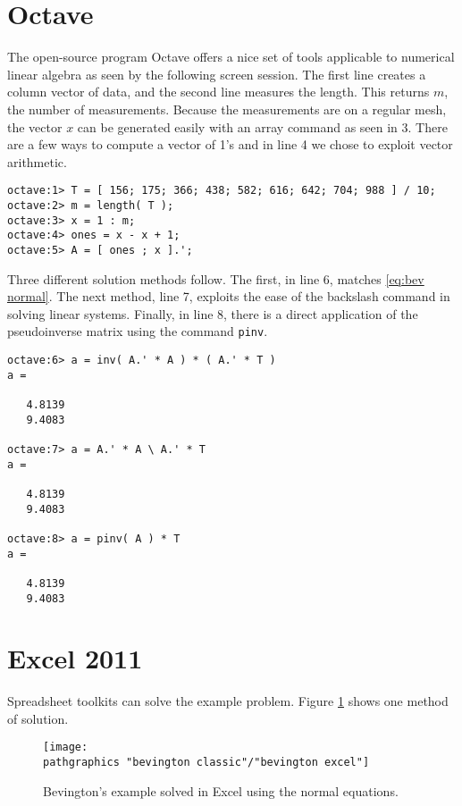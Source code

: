 \section{Octave}  %
The open-source program Octave offers a nice set of tools applicable to numerical linear algebra as seen by the following screen session. The first line creates a column vector of data, and the second line measures the length. This returns $m$, the number of measurements. Because the measurements are on a regular mesh, the vector $x$ can be generated easily with an array command as seen in 3. There are a few ways to compute a vector of 1's and in line 4 we chose to exploit vector arithmetic.
{\footnotesize{\begin{verbatim}
octave:1> T = [ 156; 175; 366; 438; 582; 616; 642; 704; 988 ] / 10;
octave:2> m = length( T );
octave:3> x = 1 : m;
octave:4> ones = x - x + 1;
octave:5> A = [ ones ; x ].';
\end{verbatim}}}
Three different solution methods follow. The first, in line 6, matches \eqref{eq:bev normal}. The next method, line 7, exploits the ease of the backslash command in  solving linear systems. Finally, in line 8, there is a direct application of the pseudoinverse matrix using the command \texttt{pinv}.
{\footnotesize{\begin{verbatim}
octave:6> a = inv( A.' * A ) * ( A.' * T )
a =

   4.8139
   9.4083

octave:7> a = A.' * A \ A.' * T
a =

   4.8139
   9.4083

octave:8> a = pinv( A ) * T
a =

   4.8139
   9.4083
\end{verbatim}}}

\section{Excel 2011}  %
Spreadsheet toolkits can solve the example problem. Figure \ref{fig:bevington xl} shows one method of solution.
\begin{figure}[htbp] %
   \centering
   \texttt{[image: \\pathgraphics "bevington classic"/"bevington excel"]} 
   \caption{Bevington's example solved in Excel using the normal equations.}
   \label{fig:bevington xl}
\end{figure}

